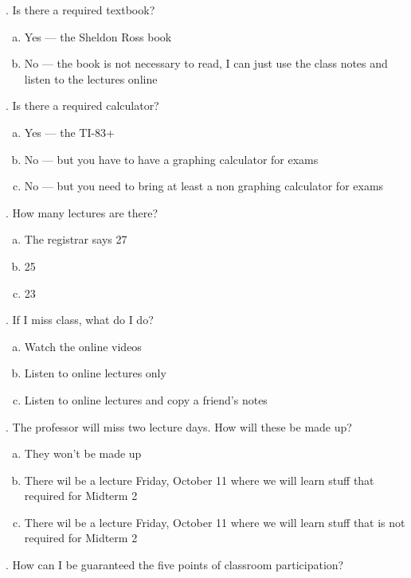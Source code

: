 \documentclass[12pt]{article}
\begin{document}
. Is there a required textbook?

\begin{enumerate}[(a)]
\item Yes --- the Sheldon Ross book
\item No --- the book is not necessary to read, I can just use the class notes and listen to the lectures online
\end{enumerate}

. Is there a required calculator?

\begin{enumerate}[(a)]
\item Yes --- the TI-83+
\item No --- but you have to have a graphing calculator for exams
\item No --- but you need to bring at least a non graphing calculator for exams
\end{enumerate}

. How many lectures are there?

\begin{enumerate}[(a)]
\item The registrar says 27
\item 25
\item 23
\end{enumerate}


. If I miss class, what do I do?

\begin{enumerate}[(a)]
\item Watch the online videos
\item Listen to online lectures only
\item Listen to online lectures and copy a friend's notes
\end{enumerate}

. The professor will miss two lecture days. How will these be made up?

\begin{enumerate}[(a)]
\item They won't be made up
\item There wil be a lecture Friday, October 11 where we will learn stuff that required for Midterm 2
\item There wil be a lecture Friday, October 11 where we will learn stuff that is not required for Midterm 2
\end{enumerate}

. How can I be guaranteed the five points of classroom participation?
\end{document}
